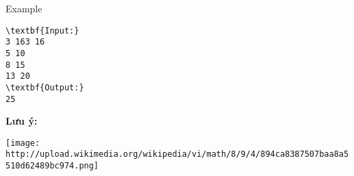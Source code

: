 Example
\begin{verbatim}
\textbf{Input:}
3 163 16
5 10
8 15
13 20
\textbf{Output:}
25\end{verbatim}

\textbf{Lưu ý:}


\texttt{[image: http://upload.wikimedia.org/wikipedia/vi/math/8/9/4/894ca8387507baa8a5510d62489bc974.png]}